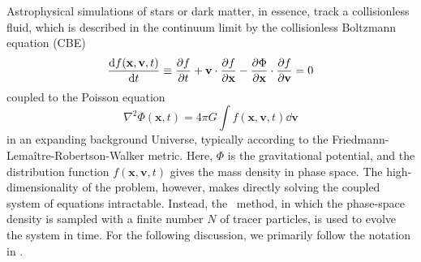Astrophysical simulations of stars or dark matter, in essence, track a collisionless fluid, which is described in the continuum limit by the collisionless Boltzmann equation (CBE)
\begin{equation}
	\frac{{\rm {d}} f(\mathbf{x}, \mathbf{v}, t)}{{\rm {d}} t}
	\equiv \frac{\partial f}{\partial t} + \mathbf{v} \cdot \frac{\partial f}{\partial \mathbf{x}}
	- \frac{\partial \Phi}{\partial \mathbf{x}} \cdot \frac{\partial f}{\partial \mathbf{v}}
	= 0
\end{equation}
coupled to the Poisson equation
\begin{equation}
	\nabla^{2} \Phi(\mathbf{x}, t) = 4 \pi G \int f(\mathbf{x}, \mathbf{v}, t) \dd \mathbf{v}
\end{equation}
in an expanding background Universe, typically according to the Friedmann-Lema\^{i}tre-Robertson-Walker metric.  Here, $\Phi$ is the gravitational potential, and the distribution function $f(\mathbf{x}, \mathbf{v}, t)$ gives the mass density in phase space.  The high-dimensionality of the problem, however, makes directly solving the coupled system of equations intractable.  Instead, the \nbody\ method, in which the phase-space density is sampled with a finite number $N$ of tracer particles, is used to evolve the system in time.  For the following discussion, we primarily follow the notation in \citet{2005MNRAS.364.1105S}.

